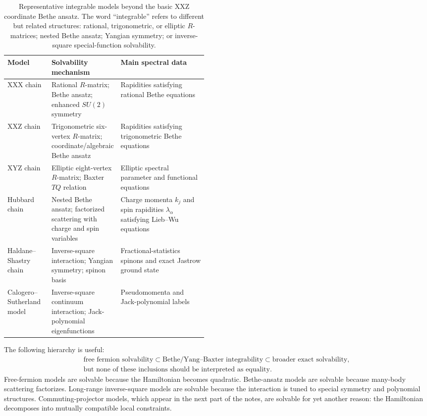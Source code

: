 \begin{table}[htbp]
\centering
\small
\begin{tabularx}{\linewidth}{@{}L{0.22\linewidth}L{0.25\linewidth}Y@{}}
\toprule
Model & Solvability mechanism & Main spectral data \\
\midrule
XXX chain & Rational $R$-matrix; Bethe ansatz; enhanced $SU(2)$ symmetry & Rapidities satisfying rational Bethe equations \\
XXZ chain & Trigonometric six-vertex $R$-matrix; coordinate/algebraic Bethe ansatz & Rapidities satisfying trigonometric Bethe equations \\
XYZ chain & Elliptic eight-vertex $R$-matrix; Baxter $TQ$ relation & Elliptic spectral parameter and functional equations \\
Hubbard chain & Nested Bethe ansatz; factorized scattering with charge and spin variables & Charge momenta $k_j$ and spin rapidities $\lambda_\alpha$ satisfying Lieb--Wu equations \\
Haldane--Shastry chain & Inverse-square interaction; Yangian symmetry; spinon basis & Fractional-statistics spinons and exact Jastrow ground state \\
Calogero--Sutherland model & Inverse-square continuum interaction; Jack-polynomial eigenfunctions & Pseudomomenta and Jack-polynomial labels \\
\bottomrule
\end{tabularx}
\caption{Representative integrable models beyond the basic XXZ coordinate
Bethe ansatz.  The word ``integrable'' refers to different but related
structures: rational, trigonometric, or elliptic $R$-matrices; nested Bethe
ansatz; Yangian symmetry; or inverse-square special-function solvability.}
\label{tab:further-integrability-comparison}
\end{table}

The following hierarchy is useful:
\begin{equation}
\label{eq:further-integrability-hierarchy}
\begin{gathered}
    \text{free fermion solvability}
    \subset
    \text{Bethe/Yang--Baxter integrability}
    \subset
    \text{broader exact solvability},\\
    \text{but none of these inclusions should be interpreted as equality.}
\end{gathered}
\end{equation}
Free-fermion models are solvable because the Hamiltonian becomes quadratic.
Bethe-ansatz models are solvable because many-body scattering factorizes.
Long-range inverse-square models are solvable because the interaction is tuned
to special symmetry and polynomial structures.  Commuting-projector models,
which appear in the next part of the notes, are solvable for yet another reason:
the Hamiltonian decomposes into mutually compatible local constraints.

